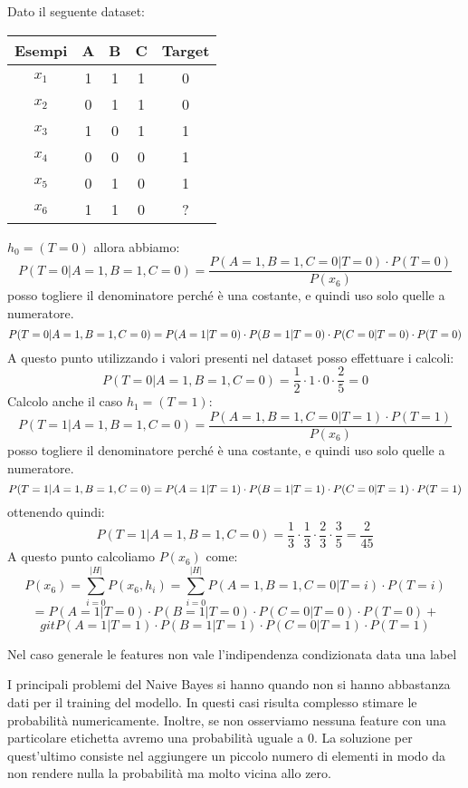 \begin{esempio}
    Dato il seguente dataset: 
    \begin{table}[!ht]
        \centering
        \begin{tabular}{c|ccc|c}
            Esempi & A & B & C & Target \\ \hline
            $x_1$ & 1 & 1 & 1 & 0 \\ \hline
            $x_2$ & 0 & 1 & 1 & 0 \\ \hline
            $x_3$ & 1 & 0 & 1 & 1 \\ \hline
            $x_4$ & 0 & 0 & 0 & 1 \\ \hline
            $x_5$ & 0 & 1 & 0 & 1 \\ \hline
            $x_6$ & 1 & 1 & 0 & ? \\ 
        \end{tabular}
    \end{table}
    $h_0 = (T = 0)$ allora abbiamo: $$P(T = 0 | A = 1, B = 1, C = 0) = \frac{P(A = 1, B = 1, C = 0 | T = 0) \cdot P(T = 0)}{P(x_6)}$$ posso togliere il denominatore perché è una costante, e quindi uso solo quelle a numeratore. $$P(T = 0 | A = 1, B = 1, C = 0) = \\ P(A = 1 | T = 0) \cdot P(B = 1 | T = 0) \cdot P(C = 0 | T = 0) \cdot P(T = 0)$$ A questo punto utilizzando i valori presenti nel dataset posso effettuare i calcoli: $$P(T = 0 | A = 1, B = 1, C = 0) = \frac{1}{2} \cdot 1 \cdot 0 \cdot \frac{2}{5} = 0$$ Calcolo anche il caso $h_1 = (T = 1)$: $$P(T = 1 | A = 1, B = 1, C = 0) = \frac{P(A = 1, B = 1, C = 0 | T = 1) \cdot P(T = 1)}{P(x_6)}$$ posso togliere il denominatore perché è una costante, e quindi uso solo quelle a numeratore. $$P(T = 1 | A = 1, B = 1, C = 0) = \\ P(A = 1 | T = 1) \cdot P(B = 1 | T = 1) \cdot P(C = 0 | T = 1) \cdot P(T = 1)$$ ottenendo quindi: $$P(T = 1 | A = 1, B = 1, C = 0) = \frac{1}{3} \cdot \frac{1}{3} \cdot \frac{2}{3} \cdot \frac{3}{5} = \frac{2}{45}$$ A questo punto calcoliamo $P(x_6)$ come: $$P(x_6) = \sum_{i = 0}^{|H|} P(x_6, h_i) = \sum_{i = 0}^{|H|} P(A =  1, B = 1, C = 0 | T = i) \cdot P(T = i)$$ $$= P(A = 1 | T = 0) \cdot P(B = 1 | T = 0) \cdot P(C = 0 | T = 0) \cdot P(T = 0) + $$ $$gitP(A = 1 | T = 1) \cdot P(B = 1 | T = 1) \cdot P(C = 0 | T = 1) \cdot P(T = 1)$$
\end{esempio}
Nel caso generale le features non vale l'indipendenza condizionata data una label

I principali problemi del Naive Bayes si hanno quando non si hanno abbastanza dati per il training del modello. In questi casi risulta complesso stimare le probabilità numericamente. Inoltre, se non osserviamo nessuna feature con una particolare etichetta avremo una probabilità uguale a $0$. La soluzione per quest'ultimo consiste nel aggiungere un piccolo numero di elementi in modo da non rendere nulla la probabilità ma molto vicina allo zero.
